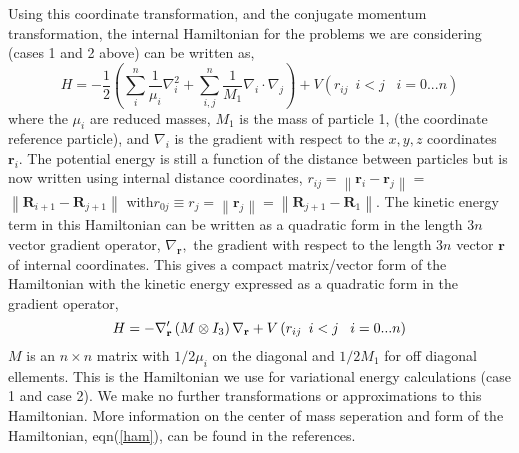 \documentclass[12pt,thmsa]{article}
\begin{document}
Using this coordinate transformation, and the conjugate momentum
transformation, the internal Hamiltonian for the problems we are considering
(cases 1 and 2 above) can be written as, 
\begin{equation}
H=-\frac 12\left( \sum_i^n\frac 1{\mu _i}\nabla _i^2+\sum_{i,j}^n\frac
1{M_1}\nabla _i\cdot \nabla _j\right) +V\left(
r_{ij}\,\,\,i<j\,\,\,\,\,i=0...n\right)  \label{intham1}
\end{equation}
where the $\mu _i$ are reduced masses, $M_1$ is the mass of particle 1, (the
coordinate reference particle), and $\nabla _i$ is the gradient with respect
to the $x,y,z$ coordinates $\mathbf{r}_i$. The potential energy is still a
function of the distance between particles but is now written using internal
distance coordinates, $r_{ij}=\left\| \mathbf{r}_i-\mathbf{r}_j\right\| =$ $%
\left\| \mathbf{R}_{i+1}-\mathbf{R}_{j+1}\right\| \,\,$with\thinspace $%
r_{0j}\equiv r_j=\left\| \mathbf{r}_j\right\| =\left\| \mathbf{R}_{j+1}-%
\mathbf{R}_1\right\| .$ The kinetic energy term in this Hamiltonian can be
written as a quadratic form in the length $3n$ vector gradient operator, $%
\nabla _{\mathbf{r}},$ the gradient with respect to the length $3n$ vector $%
\mathbf{r}$ of internal coordinates. This gives a compact matrix/vector form
of the Hamiltonian with the kinetic energy expressed as a quadratic form in
the gradient operator, 
\begin{equation}
H=-\nabla _{\mathbf{r}}^{\prime }\left( M\otimes I_3\right) \nabla _{\mathbf{%
r}}+V\left( r_{ij}\,\,\,i<j\,\,\,\,\,i=0...n\right)  \label{ham}
\end{equation}
$M$ is an $n\times n$ matrix with $1/2\mu _i$ on the diagonal and $1/2M_1$
for off diagonal ellements. This is the Hamiltonian we use for variational
energy calculations (case 1 and case 2). We make no further transformations
or approximations to this Hamiltonian. More information on the center of
mass seperation and form of the Hamiltonian, eqn(\ref{ham}), can be found in
the references\cite{Kinghorn93 Kinghorn95b}.
\end{document}
